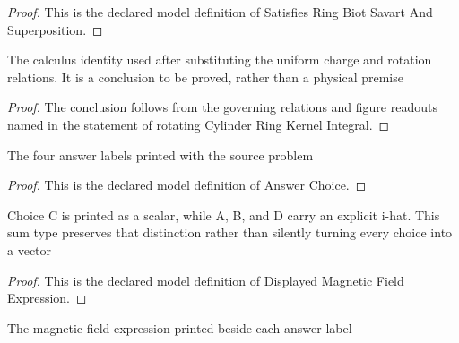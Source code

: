 \begin{proof}
  This is the declared model definition of Satisfies Ring Biot Savart And Superposition.
\end{proof}
\begin{lemma}
  \label{lem:physics:phyx-mini-0969:phyxminiproblems-problemphyxmini0969-rotatingcylinderringkernelintegral}
  The calculus identity used after substituting the uniform charge and rotation relations. It is a conclusion to be proved, rather than a physical premise
\end{lemma}
\begin{proof}
  The conclusion follows from the governing relations and figure readouts named in the statement of rotating Cylinder Ring Kernel Integral.
\end{proof}
\begin{definition}
  \label{def:physics:phyx-mini-0969:phyxminiproblems-problemphyxmini0969-answerchoice}
  The four answer labels printed with the source problem
\end{definition}
\begin{proof}
  This is the declared model definition of Answer Choice.
\end{proof}
\begin{definition}
  \label{def:physics:phyx-mini-0969:phyxminiproblems-problemphyxmini0969-displayedmagneticfieldexpression}
  Choice C is printed as a scalar, while A, B, and D carry an explicit i-hat. This sum type preserves that distinction rather than silently turning every choice into a vector
\end{definition}
\begin{proof}
  This is the declared model definition of Displayed Magnetic Field Expression.
\end{proof}
\begin{definition}
  \label{def:physics:phyx-mini-0969:phyxminiproblems-problemphyxmini0969-answerchoice-displayedexpression}
  The magnetic-field expression printed beside each answer label
\end{definition}
